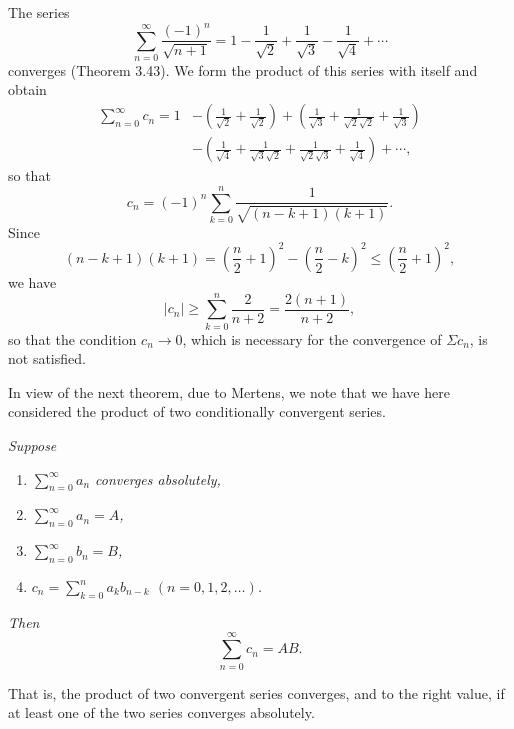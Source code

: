 The series
\[ \sum_{n=0}^{\infty} \frac{(-1)^n}{\sqrt{n+1}}
   = 1 - \frac{1}{\sqrt2} + \frac{1}{\sqrt3} - \frac{1}{\sqrt4} + \cdots \]
converges (Theorem 3.43). We form the product of this series with itself and
obtain
\begin{align*}
  \sum_{n=0}^{\infty} c_n = 1
    &- \left(\frac{1}{\sqrt2}+\frac{1}{\sqrt2}\right)
     + \left(\frac{1}{\sqrt3}+\frac{1}{\sqrt2\sqrt2}+\frac{1}{\sqrt3}\right)\\
    &- \left(\frac{1}{\sqrt4}+\frac{1}{\sqrt3\sqrt2}+\frac{1}{\sqrt2\sqrt3}
     +\frac{1}{\sqrt4}\right) + \cdots,
\end{align*}
so that
\[ c_n = (-1)^n \sum_{k=0}^{n} \frac{1}{\sqrt{(n-k+1)(k+1)}}. \]
Since
\[ (n-k+1)(k+1) = \left(\frac n2+1\right)^2 - \left(\frac n2-k\right)^2
   \le \left(\frac n2+1\right)^2, \]
we have
\[ |c_n| \ge \sum_{k=0}^{n} \frac{2}{n+2} = \frac{2(n+1)}{n+2}, \]
so that the condition $c_n \to 0$, which is necessary for the convergence of
$\Sigma c_n$, is not satisfied.

In view of the next theorem, due to Mertens, we note that we have here
considered the product of two conditionally convergent series.

\emph{Suppose}
\begin{enumerate}[label=(\alph*), leftmargin=2.2em, itemsep=1pt, topsep=3pt]
  \item \emph{$\sum_{n=0}^{\infty} a_n$ converges absolutely,}
  \item \emph{$\sum_{n=0}^{\infty} a_n = A$,}
  \item \emph{$\sum_{n=0}^{\infty} b_n = B$,}
  \item \emph{$c_n = \sum_{k=0}^{n} a_kb_{n-k}$ \quad $(n = 0,1,2,\dots)$.}
\end{enumerate}
\emph{Then}
\[ \sum_{n=0}^{\infty} c_n = AB. \]

That is, the product of two convergent series converges, and to the right
value, if at least one of the two series converges absolutely.

